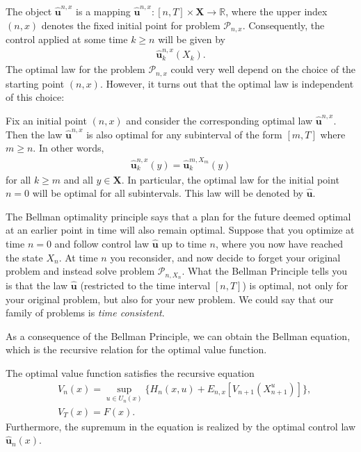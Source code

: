 \documentclass[\topdir/lecture\_notes.tex]{subfiles}
\begin{document}
The object $\hat{\mathbf{u}}^{n, x}$ is a mapping $\hat{\mathbf{u}}^{n, x}:[n, T] \times \mathbf{X} \rightarrow \mathbb{R}$, where the upper index $(n, x)$ denotes the fixed initial point for problem $\mathcal{P}_{n, x}$. Consequently, the control applied at some time $k \geq n$ will be given by
\begin{align*}
\hat{\mathbf{u}}_{k}^{n, x}(X_{k}).
\end{align*}
The optimal law for the problem $\mathcal{P}_{n, x}$ could very well depend on the choice of the starting point $(n, x)$. However, it turns out that the optimal law is independent of this choice:
\begin{theorem}\label{thm: bellman_opti}
Fix an initial point $(n, x)$ and consider the corresponding optimal law $\hat{\mathbf{u}}^{n, x}$. Then the law $\hat{\mathbf{u}}^{n, x}$ is also optimal for any subinterval of the form $[m, T]$ where $m \geq n$. In other words,
\begin{align*}
\hat{\mathbf{u}}_{k}^{n, x}(y)=\hat{\mathbf{u}}_{k}^{m, X_{m}}(y)
\end{align*}
for all $k \geq m$ and all $y \in \mathbf{X}$. In particular, the optimal law for the initial point $n=0$ will be optimal for all subintervals. This law will be denoted by $\hat{\mathbf{u}}$.
\end{theorem}
The Bellman optimality principle says that a plan for the future deemed optimal at an earlier point in time will also remain optimal. Suppose that you optimize at time $n=0$ and follow control law $\hat{\mathbf{u}}$ up to time $n$, where you now have reached the state $X_{n}$. At time $n$ you reconsider, and now decide to forget your original problem and instead solve problem $\mathcal{P}_{n, X_{n}}$. What the Bellman Principle tells you is that the law $\hat{\mathbf{u}}$ (restricted to the time interval $[n, T]$) is optimal, not only for your original problem, but also for your new problem. We could say that our family of problems is \emph{time consistent}.

As a consequence of the Bellman Principle, we can obtain the Bellman equation, which is the recursive relation for the optimal value function.
\begin{theorem}\label{thm: bellman_eq}
The optimal value function satisfies the recursive equation
\begin{align*}
& V_{n}(x)=\sup _{u \in U_{n}(x)}\{H_{n}(x, u)+E_{n, x}\left[V_{n+1}(X_{n+1}^{u})\right]\}, \\
& V_{T}(x)=F(x) .
\end{align*}
Furthermore, the supremum in the equation is realized by the optimal control law $\hat{\mathbf{u}}_{n}(x)$.
\end{theorem}
\end{document}
